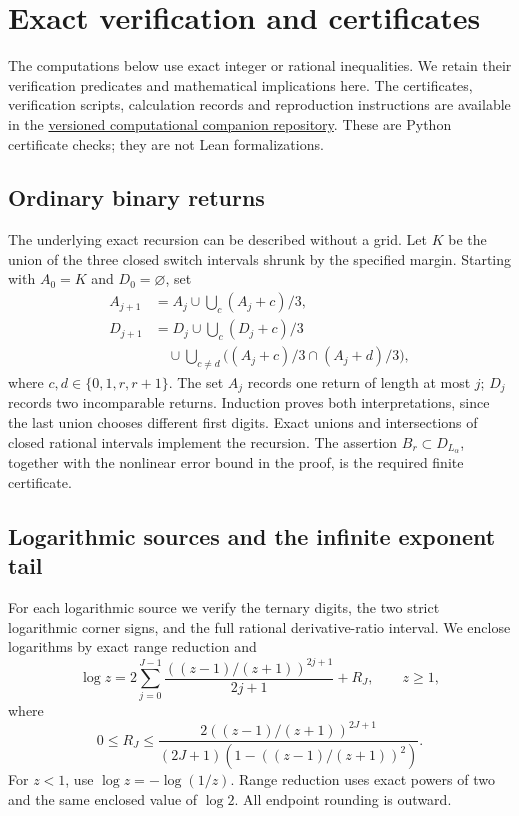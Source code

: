 \documentclass[11pt,a4paper]{article}
\begin{document}
\section{Exact verification and certificates}\label{app:certificates}

The computations below use exact integer or rational inequalities.
We retain their verification predicates and mathematical implications
here. The certificates, verification scripts, calculation
records and reproduction instructions are available in the
\href{https://github.com/Nero-17/LEAN-Formalisation-solutions-of-fermat-cantor-equation/tree/v1.2.0}
{versioned computational companion repository}.
These are Python certificate checks; they are not Lean formalizations.

\subsection{Ordinary binary returns}
The underlying exact recursion can be described without a grid.
Let \(K\) be the union of the three closed switch intervals
shrunk by the specified margin. Starting with \(A_0=K\) and
\(D_0=\varnothing\), set
\begin{align*}
A_{j+1}&=A_j\cup\bigcup_c(A_j+c)/3,\\
D_{j+1}&=D_j\cup\bigcup_c(D_j+c)/3\\
&\quad{}\cup\bigcup_{c\ne d}
       \bigl((A_j+c)/3\cap(A_j+d)/3\bigr),
\end{align*}
where \(c,d\in\{0,1,r,r+1\}\).
The set \(A_j\) records one return of length at most \(j\);
\(D_j\) records two incomparable returns. Induction proves
both interpretations, since the last union chooses different
first digits. Exact unions and intersections of closed rational
intervals implement the recursion. The assertion
\(B_r\subset D_{L_\alpha}\), together with the nonlinear error bound
in the proof, is the required finite certificate.

\subsection{Logarithmic sources and the infinite exponent tail}
For each logarithmic source we verify the ternary digits, the two
strict logarithmic corner signs, and the full rational
derivative-ratio interval.
We enclose logarithms by exact range reduction and
\[
\log z=2\sum_{j=0}^{J-1}
  \frac{((z-1)/(z+1))^{2j+1}}{2j+1}+R_J,\qquad z\geq1,
\]
where
\[
0\leq R_J\leq
\frac{2((z-1)/(z+1))^{2J+1}}
 {(2J+1)(1-((z-1)/(z+1))^2)} .
\]
For \(z<1\), use \(\log z=-\log(1/z)\).
Range reduction uses exact powers of two and the same enclosed
value of \(\log2\). All endpoint rounding is outward.
\end{document}
